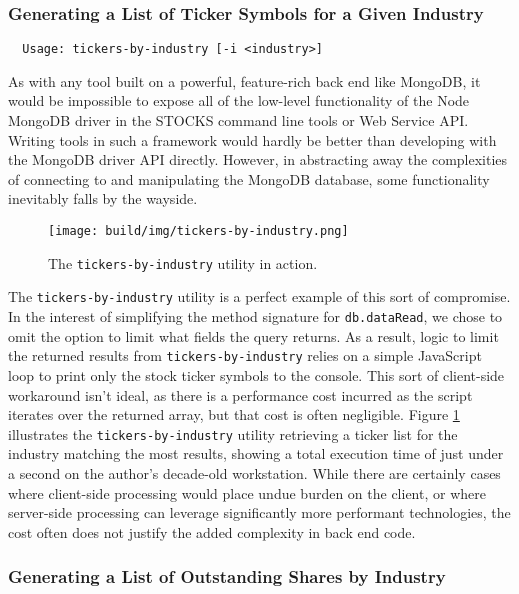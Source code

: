 \documentclass[
11pt,
titlepage,
]{article}
\begin{document}
\subsubsection{Generating a List of Ticker Symbols for a Given Industry}

\begin{lstlisting}
  Usage: tickers-by-industry [-i <industry>]
\end{lstlisting}

As with any tool built on a powerful, feature-rich back end like MongoDB, it
would be impossible to expose all of the low-level functionality of the Node
MongoDB driver in the STOCKS command line tools or Web Service API. Writing
tools in such a framework would hardly be better than developing with the
MongoDB driver API directly. However, in abstracting away the complexities of
connecting to and manipulating the MongoDB database, some functionality
inevitably falls by the wayside.

\begin{figure}[bp]
  \texttt{[image: build/img/tickers-by-industry.png]}
  \caption{The \texttt{tickers-by-industry} utility in action.}
  \label{fig:tickers-by-industry}
\end{figure}

The \texttt{tickers-by-industry} utility is a perfect example of this sort of
compromise. In the interest of simplifying the method signature for
\texttt{db.dataRead}, we chose to omit the option to limit what fields the query
returns. As a result, logic to limit the returned results from
\texttt{tickers-by-industry} relies on a simple JavaScript loop to print only
the stock ticker symbols to the console. This sort of client-side workaround
isn't ideal, as there is a performance cost incurred as the script iterates over
the returned array, but that cost is often negligible. Figure
\ref{fig:tickers-by-industry} illustrates the \texttt{tickers-by-industry}
utility retrieving a ticker list for the industry matching the most results,
showing a total execution time of just under a second on the author's decade-old
workstation. While there are certainly cases where client-side
processing would place undue burden on the client, or where server-side
processing can leverage significantly more performant technologies, the cost
often does not justify the added complexity in back end code.

\subsubsection{Generating a List of Outstanding Shares by Industry}
\end{document}
